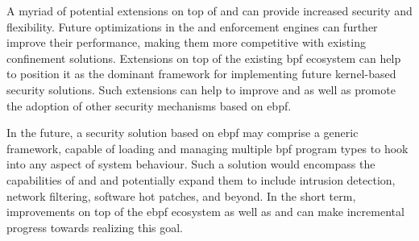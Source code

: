 A myriad of potential extensions on top of \bpfbox{} and \bpfcontain{} can provide
increased security and flexibility.  Future optimizations in the \bpfbox{} and
\bpfcontain{} enforcement engines can further improve their performance, making them more
competitive with existing confinement solutions. Extensions on top of the existing
\gls{bpf} ecosystem can help to position it as the dominant framework for implementing
future kernel-based security solutions. Such extensions can help to improve \bpfbox{} and
\bpfcontain{} as well as promote the adoption of other security mechanisms based on
\gls{ebpf}.

In the future, a security solution based on \gls{ebpf} may comprise a generic framework,
capable of loading and managing multiple \gls{bpf} program types to hook into any aspect
of system behaviour. Such a solution would encompass the capabilities of \bpfbox{} and
\bpfcontain{} and potentially expand them to include intrusion detection, network
filtering, software hot patches, and beyond. In the short term, improvements on top of the
\gls{ebpf} ecosystem as well as \bpfbox{} and \bpfcontain{} can make incremental progress
towards realizing this goal.
